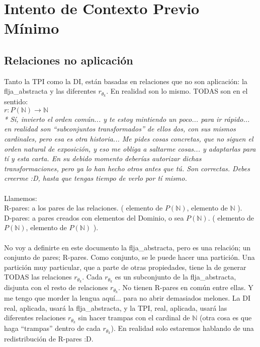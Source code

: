 \chapter{Intento de Contexto Previo Mínimo}

	\section{Relaciones no aplicación}

	\noindent
	Tanto la TPI como la DI, están basadas en relaciones que no son aplicación: la flja\_abstracta y las diferentes $r_{\theta_{k}}$. En realidad son lo mismo. TODAS son en el sentido:\\
	$r: P(\mathbb{N}) \rightarrow \mathbb{N}$\\
	\textit{* Sí, invierto el orden común... y te estoy mintiendo un poco... para ir rápido... en realidad son ``subconjuntos transformados'' de ellos dos, con sus mismos cardinales, pero esa es otra historia... Me pides cosas concretas, que no siguen el orden natural de exposición, y eso me obliga a saltarme cosas... y adaptarlas para tí y esta carta. En su debido momento deberías autorizar dichas transformaciones, pero ya lo han hecho otros antes que tú. Son correctas. Debes creerme :D, hasta que tengas tiempo de verlo por tí mismo.}
	\\\\
	
	\noindent
	Llamemos:\\
	R-pares: a los pares de las relaciones. ( elemento de $P(\mathbb{N})$, elemento de $\mathbb{N}$ ).\\
	D-pares: a pares creados con elementos del Dominio, o sea $P(\mathbb{N})$. ( elemento de $P(\mathbb{N})$, elemento de $P(\mathbb{N})$ ).
	\\\\
	
	\noindent
	No voy a definirte en este documento la flja\_abstracta, pero es una relación; un conjunto de pares; R-pares. Como conjunto, se le puede hacer una partición. Una partición muy particular, que a parte de otras propiedades, tiene la de generar TODAS las relaciones $r_{\theta_{k}}$. Cada $r_{\theta_{k}}$ es un subconjunto de la flja\_abstracta, disjunta con el resto de relaciones $r_{\theta_{k}}$. No tienen R-pares en común entre ellas. Y me tengo que morder la lengua aquí... para no abrir demasiados melones. La DI real, aplicada, usará la flja\_abstracta, y la TPI, real, aplicada, usará las diferentes relaciones $r_{\theta_{k}}$ sin hacer trampas con el cardinal de $\mathbb{N}$ (otra cosa es que haga ``trampas'' dentro de cada $r_{\theta_{k}}$). En realidad solo estaremos hablando de una redistribución de R-pares :D.
	\\\\
	
